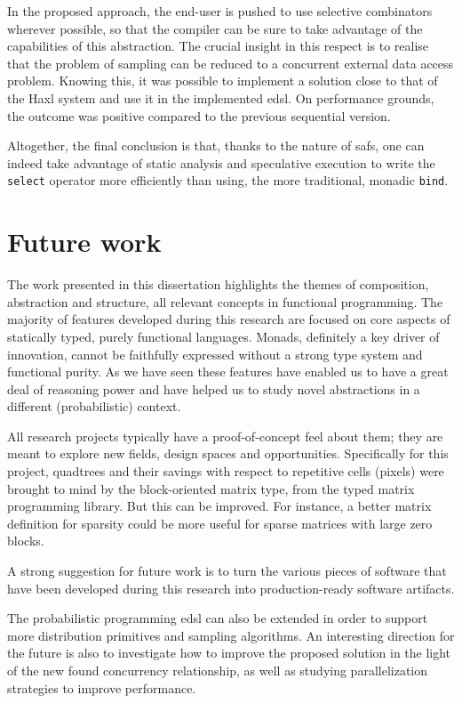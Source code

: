\documentclass[
  oneside,
  11pt, a4paper,
  footinclude=true,
  headinclude=true,
  cleardoublepage=empty
]{scrbook}
\theoremstyle{definition}
\theoremstyle{definition}
\begin{document}
	        In the proposed approach, the end-user is pushed to use selective combinators wherever possible, so that the compiler can be sure to take advantage of the capabilities of this abstraction. The crucial insight in this respect is to realise that the problem of sampling can be reduced to a concurrent external data access problem. Knowing this, it was possible to implement a solution close to that of the Haxl system and use it in the implemented \gls{edsl}. On performance grounds, the outcome was positive compared to the previous sequential version.
	        
	        Altogether, the final conclusion is that, thanks to the nature of \glspl{saf}, one can indeed take advantage of static analysis and speculative execution to write the \texttt{select} operator more efficiently than using, the more traditional, monadic \texttt{bind}.
	        
	    \section{Future work}
	    
	     The work presented in this dissertation highlights the themes of composition, abstraction and structure, all relevant concepts in functional programming. The majority of features developed during this research are focused on core aspects of statically typed, purely functional languages. Monads, definitely a key driver of innovation, cannot be faithfully expressed without a strong type system and functional purity. As we have seen these features have enabled us to have a great deal of reasoning power and have helped us to study novel abstractions in a different (probabilistic) context.
	    
	    All research projects typically have a proof-of-concept feel about them; they are meant to explore new fields, design spaces and opportunities. Specifically for this project, quadtrees \citep{samet1984quadtree} and their savings with respect to repetitive cells (pixels) were brought to mind by the block-oriented matrix type, from the typed matrix programming library. But this can be improved. For instance, a better matrix definition for sparsity could be more useful for sparse matrices with large zero blocks. 
	    
	    A strong suggestion for future work is to turn the various pieces of software that have been developed during this research into production-ready software artifacts.
	    
	    The probabilistic programming \gls{edsl} can also be extended in order to support more distribution primitives and sampling algorithms. An interesting direction for the future is also to investigate how to improve the proposed solution in the light of the new found concurrency relationship, as well as studying parallelization strategies to improve performance. 
	     
\end{document}
